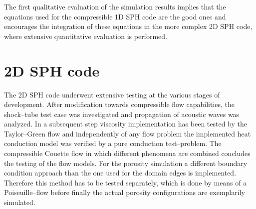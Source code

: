 \documentclass{report}
\begin{document}
The first qualitative evaluation of the simulation results implies that the equations used for the compressible 1D SPH code are the good ones and encourages the integration of these equations in the more complex 2D SPH code, where extensive quantitative evaluation is performed.  

 


\section{2D SPH code}
\label{sec:2DSPHcodeResults}

The 2D SPH code underwent extensive testing at the various stages of development. After modification towards compressible flow capabilities, the shock--tube test case was investigated and propagation of acoustic waves was analyzed. In a subsequent step viscosity implementation has been tested by the Taylor--Green flow and independently of any flow problem the implemented heat conduction model was verified by a pure conduction test--problem. The compressible Couette flow in which different phenomena are combined concludes the testing of the flow models. For the porosity simulation a different boundary condition approach than the one used for the domain edges is implemented. Therefore this method has to be tested separately, which is done by means of a Poiseuille--flow before finally the actual porosity configurations are exemplarily simulated.
\end{document}
